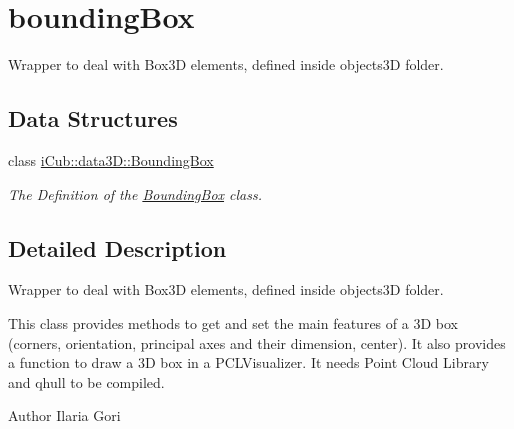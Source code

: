 \section{bounding\+Box}
\label{group__boundingBox}


Wrapper to deal with Box3D elements, defined inside objects3D folder.  


\subsection*{Data Structures}
\begin{DoxyCompactItemize}
\item 
class \hyperlink{classiCub_1_1data3D_1_1BoundingBox}{i\+Cub\+::data3\+D\+::\+Bounding\+Box}
\begin{DoxyCompactList}\small\item\em The Definition of the \hyperlink{classiCub_1_1data3D_1_1BoundingBox}{Bounding\+Box} class. \end{DoxyCompactList}\end{DoxyCompactItemize}


\subsection{Detailed Description}
Wrapper to deal with Box3D elements, defined inside objects3D folder. 

This class provides methods to get and set the main features of a 3D box (corners, orientation, principal axes and their dimension, center). It also provides a function to draw a 3D box in a P\+C\+L\+Visualizer. It needs Point Cloud Library and qhull to be compiled.

\begin{DoxyAuthor}{Author}
Ilaria Gori 
\end{DoxyAuthor}
